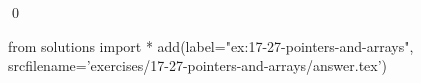 
\begin{ex}
  \label{ex:17-27-pointers-and-arrays}
  
  \qed
\end{ex}
\begin{python0}
from solutions import *
add(label="ex:17-27-pointers-and-arrays",
    srcfilename='exercises/17-27-pointers-and-arrays/answer.tex')
\end{python0}
